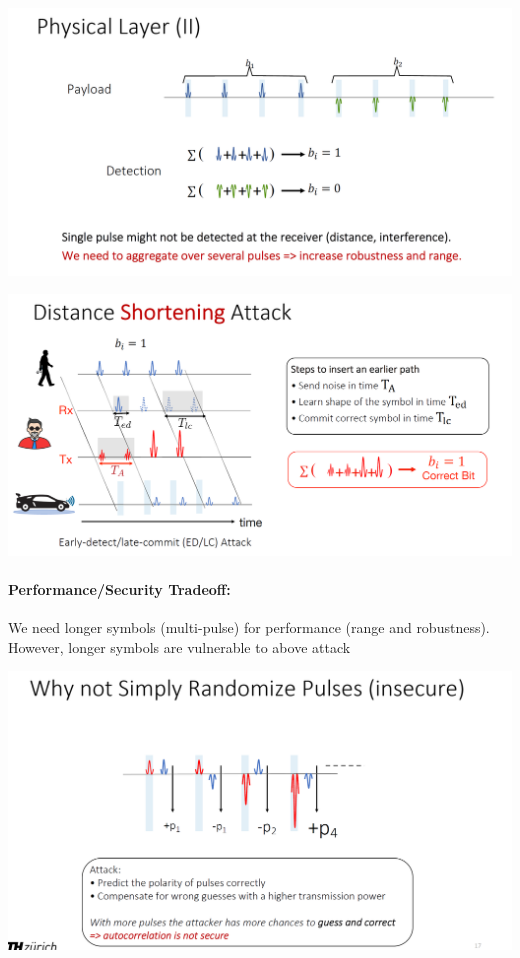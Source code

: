 \begin{minipage}{\linewidth}
    \centering      
    \includegraphics[width=\linewidth]{Figures/L5_physical_layer2.PNG} 
\end{minipage}

\begin{minipage}{\linewidth}
    \centering      
    \includegraphics[width=\linewidth]{Figures/L5_shortening_attack.PNG} 
\end{minipage}

\paragraph{Performance/Security Tradeoff:} We need longer symbols (multi-pulse) for performance (range and robustness). However, longer symbols are vulnerable to above attack

\begin{minipage}{\linewidth}
    \centering      
    \includegraphics[width=\linewidth]{Figures/L5_pulse_randomization.PNG} 
\end{minipage}

